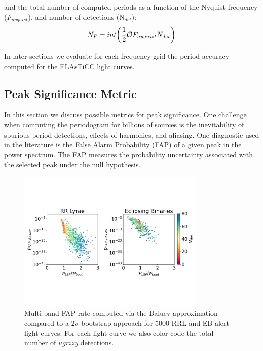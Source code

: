 \documentclass[DM,authoryear,toc]{lsstdoc}
\begin{document}
and the total number of computed periods as a function of the Nyquist frequency ($F_{nyquist}$), and number of detections (N$_{det}$): 
\begin{equation}
N_{P} = int \bigg{(} \frac{1}{2} \mathcal{O} F_{nyquist} N_{det} \bigg{)}
\end{equation}

In later sections we evaluate for each frequency grid the period accuracy computed for the ELAsTiCC light curves.

\subsection{Peak Significance Metric}

In this section we discuss possible metrics for peak significance. One challenge when computing the periodogram for billions of sources is the inevitability of spurious period detections, effects of harmonics, and aliasing. One diagnostic used in the literature is the False Alarm Probability (FAP) of a given peak in the power spectrum. The FAP measures the probability uncertainty associated with the selected peak under the null hypothesis.

\begin{figure}
  \includegraphics[width=0.8\textwidth]{figures/fap_approximation_mlsp.pdf}
  \centering 
  \caption{Multi-band FAP rate computed via the Baluev approximation compared to a $2\sigma$ bootstrap approach for 5000 RRL and EB alert light curves. For each light curve we also color code the total number of $ugrizy$ detections.}
\end{figure}


\end{document}
